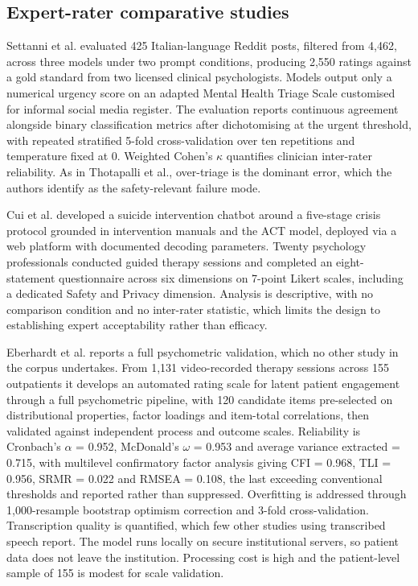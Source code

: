 \documentclass[11pt]{article}
\begin{document}
	\subsection{Expert-rater comparative studies}
	
	Settanni et al.\cite{SETTANNI2025116583} evaluated 425 Italian-language Reddit posts, filtered from 4,462, across three models under two prompt conditions, producing 2,550 ratings against a gold standard from two licensed clinical psychologists. Models output only a numerical urgency score on an adapted Mental Health Triage Scale customised for informal social media register. The evaluation reports continuous agreement alongside binary classification metrics after dichotomising at the urgent threshold, with repeated stratified 5-fold cross-validation over ten repetitions and temperature fixed at 0. Weighted Cohen's $\kappa$ quantifies clinician inter-rater reliability. As in Thotapalli et al., over-triage is the dominant error, which the authors identify as the safety-relevant failure mode.
	
	Cui et al.\cite{fpsyt.2025.1634714} developed a suicide intervention chatbot around a five-stage crisis protocol grounded in intervention manuals and the ACT model, deployed via a web platform with documented decoding parameters. Twenty psychology professionals conducted guided therapy sessions and completed an eight-statement questionnaire across six dimensions on 7-point Likert scales, including a dedicated Safety and Privacy dimension. Analysis is descriptive, with no comparison condition and no inter-rater statistic, which limits the design to establishing expert acceptability rather than efficacy.
	
	Eberhardt et al.\cite{Eberhardt2025} reports a full psychometric validation, which no other study in the corpus undertakes. From 1,131 video-recorded therapy sessions across 155 outpatients it develops an automated rating scale for latent patient engagement through a full psychometric pipeline, with 120 candidate items pre-selected on distributional properties, factor loadings and item-total correlations, then validated against independent process and outcome scales. Reliability is Cronbach's $\alpha$ = 0.952, McDonald's $\omega$ = 0.953 and average variance extracted = 0.715, with multilevel confirmatory factor analysis giving CFI = 0.968, TLI = 0.956, SRMR = 0.022 and RMSEA = 0.108, the last exceeding conventional thresholds and reported rather than suppressed. Overfitting is addressed through 1,000-resample bootstrap optimism correction and 3-fold cross-validation. Transcription quality is quantified, which few other studies using transcribed speech report. The model runs locally on secure institutional servers, so patient data does not leave the institution. Processing cost is high and the patient-level sample of 155 is modest for scale validation.
	
\end{document}
